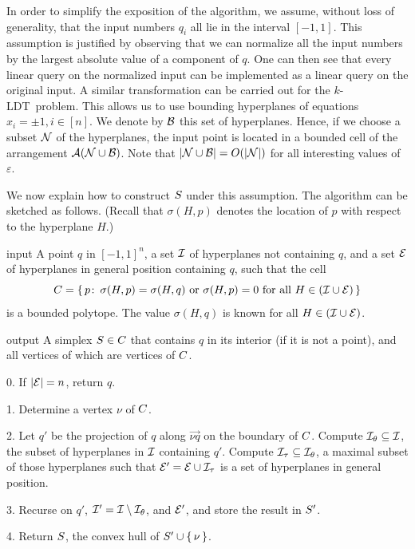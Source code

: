 In order to simplify the exposition of the algorithm, we assume, without
loss of generality, that the input numbers $q_i$ all lie in the interval $[-1,1]$.
This assumption is justified by observing that we can normalize all the input
numbers by the largest absolute value of a component of $q$. One can then see that
every linear query on the normalized input can be implemented
as a linear query on the original input. A similar transformation can be carried out
for the \(k\)-LDT\ problem.
This allows us to use bounding hyperplanes of equations $x_i = \pm 1, i\in [n]$.
We denote by $\mathcal{B}$ this set of hyperplanes. Hence, if we choose a subset
\(\mathcal{N}\) of the hyperplanes, the input point is located in a bounded cell
of the arrangement \(\mathcal{A}(\mathcal{N} \cup \mathcal{B})\). Note that \(|{\mathcal{N} \cup
\mathcal{B}}| = O(|{\mathcal{N}}|)\) for all interesting values of \(\varepsilon\).

We now explain how to construct \(S\) under this assumption. The algorithm
can be sketched as follows. (Recall that $\sigma(H,p)$ denotes the location
of $p$ with respect to the hyperplane $H$.)

\begin{algorithm}\label{algo:simplex}
\item[input] A point \(q\) in ${[-1,1]}^n$, a set $\mathcal{I}$ of hyperplanes not
	containing \(q\), and a set $\mathcal{E}$ of hyperplanes in general position
	containing \(q\), such that the cell
	$$
	C = \{\,p \colon\, \sigma(H,p) = \sigma(H,q)
			\ \text{or}\ \sigma(H,p) = 0
			\ \text{for all}\ H \in (\mathcal{I} \cup \mathcal{E})
		\,\}
	$$
	is a bounded polytope. The value \(\sigma(H,q)\) is known for
	all \(H \in (\mathcal{I} \cup \mathcal{E})\). %
\item[output] A simplex \(S \in C\) that contains \(q\) in
	its interior (if it is not a point), and all vertices
	of which are vertices of \(C\).
\item[0.] If $|{\mathcal{E}}|=n$, return $q$.
\item[1.] Determine a vertex \(\nu\) of $C$.
\item[2.] Let \(q'\) be the projection of \(q\) along \(\vec{\nu q}\) on the
	boundary of \(C\). Compute \(\mathcal{I}_\theta \subseteq \mathcal{I}\), the subset of
	hyperplanes in \(\mathcal{I}\) containing \(q'\). Compute \(\mathcal{I}_{\tau} \subseteq
	\mathcal{I}_{\theta}\), a maximal subset of those hyperplanes such that \(\mathcal{E}' = \mathcal{E}
	\cup \mathcal{I}_\tau\) is a set of hyperplanes in general position.
\item[3.] Recurse on \(q'\), \(\mathcal{I}' = \mathcal{I} \setminus \mathcal{I}_\theta\), and \(\mathcal{E}'\), and
	store the result in \(S'\).
\item[4.] Return $S$, the convex hull of \(S' \cup \left\{\,{\nu}\,\right\}\).
\end{algorithm}


